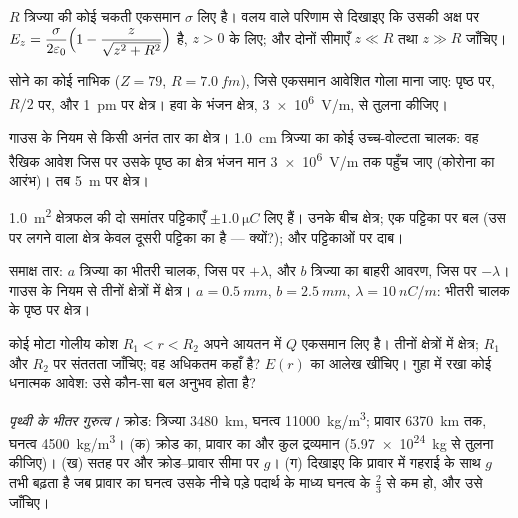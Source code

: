 \begin{exercise}[$\star\star$]\label{exo:b1:electrostatics-gauss:5}
$R$ त्रिज्या की कोई चकती एकसमान $\sigma$ लिए है। वलय वाले परिणाम से
दिखाइए कि उसकी अक्ष पर $E_z = \dfrac{\sigma}{2\varepsilon_0}\Bigl(1 - \dfrac{z}{\sqrt{z^2 +
R^2}}\Bigr)$ है, $z > 0$ के लिए; और दोनों सीमाएँ $z \ll R$ तथा $z \gg R$ जाँचिए।
\end{exercise}

\begin{exercise}[$\star\star$]\label{exo:b1:electrostatics-gauss:6}
सोने का कोई नाभिक ($Z = 79$, $R = \qty{7.0}{fm}$), जिसे एकसमान आवेशित गोला
माना जाए: पृष्ठ पर, $R/2$ पर, और \qty{1}{pm} पर क्षेत्र। हवा के भंजन
क्षेत्र, \qty{3e6}{V/m}, से तुलना कीजिए।
\end{exercise}

\begin{exercise}[$\star\star$]\label{exo:b1:electrostatics-gauss:7}
गाउस के नियम से किसी अनंत तार का क्षेत्र। \qty{1.0}{cm} त्रिज्या का कोई
उच्च-वोल्टता चालक: वह रैखिक आवेश जिस पर उसके पृष्ठ का क्षेत्र भंजन मान
\qty{3e6}{V/m} तक पहुँच जाए (कोरोना का आरंभ)। तब \qty{5}{m} पर
क्षेत्र।
\end{exercise}

\begin{exercise}[$\star\star$]\label{exo:b1:electrostatics-gauss:8}
\qty{1.0}{m^2} क्षेत्रफल की दो समांतर पट्टिकाएँ $\pm\qty{1.0}{\micro C}$ लिए
हैं। उनके बीच क्षेत्र; एक पट्टिका पर बल (उस पर लगने वाला क्षेत्र केवल दूसरी
पट्टिका का है --- क्यों?); और पट्टिकाओं पर दाब।
\end{exercise}

\begin{exercise}[$\star\star$]\label{exo:b1:electrostatics-gauss:9}
समाक्ष तार: $a$ त्रिज्या का भीतरी चालक, जिस पर $+\lambda$, और $b$ त्रिज्या
का बाहरी आवरण, जिस पर $-\lambda$। गाउस के नियम से तीनों क्षेत्रों में
क्षेत्र। $a = \qty{0.5}{mm}$, $b = \qty{2.5}{mm}$, $\lambda = \qty{10}{nC/m}$:
भीतरी चालक के पृष्ठ पर क्षेत्र।
\end{exercise}

\begin{exercise}[$\star\star\star$]\label{exo:b1:electrostatics-gauss:10}
कोई मोटा गोलीय कोश $R_1 < r < R_2$ अपने आयतन में $Q$ एकसमान लिए है। तीनों
क्षेत्रों में क्षेत्र; $R_1$ और $R_2$ पर संततता जाँचिए; वह अधिकतम कहाँ है?
$E(r)$ का आलेख खींचिए। गुहा में रखा कोई धनात्मक आवेश: उसे कौन-सा बल अनुभव
होता है?
\end{exercise}

\begin{exercise}[$\star\star\star$]\label{exo:b1:electrostatics-gauss:11}
\emph{पृथ्वी के भीतर गुरुत्व।} क्रोड: त्रिज्या \qty{3480}{km}, घनत्व
\qty{11000}{kg/m^3}; प्रावार \qty{6370}{km} तक, घनत्व \qty{4500}{kg/m^3}।
(क) क्रोड का, प्रावार का और कुल द्रव्यमान (\qty{5.97e24}{kg} से तुलना कीजिए)।
(ख) सतह पर और क्रोड--प्रावार सीमा पर $g$। (ग) दिखाइए कि
प्रावार में गहराई के साथ $g$ तभी बढ़ता है जब प्रावार का घनत्व उसके नीचे
पड़े पदार्थ के माध्य घनत्व के $\tfrac23$ से कम हो, और उसे जाँचिए।
\end{exercise}

